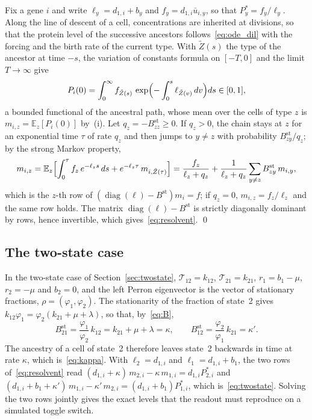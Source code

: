 \documentclass[a4paper, 11pt]{article}
\DeclareMathOperator{\diag}{diag}
\newcommand{\E}{\mathbb{E}}
\newcommand{\Tg}{\mathcal{T}}
\theoremstyle{plain}
\theoremstyle{remark}
\begin{document}
Fix a gene $i$ and write $\ell_y = d_{1,i} + b_y$ and $f_y = d_{1,i}\bar u_{i,y}$, so that $P^\ast_y = f_y/\ell_y$. Along the line of descent of a cell, concentrations are inherited at divisions, so that the protein level of the successive ancestors follows~\eqref{eq:ode_dil} with the forcing and the birth rate of the current type. With $\tilde Z(s)$ the type of the ancestor at time $-s$, the variation of constants formula on $[-T, 0]$ and the limit $T \to \infty$ give
\[
P_i(0) = \int_0^\infty f_{\tilde Z(s)}\,\exp\Bigl(-\int_0^s \ell_{\tilde Z(v)}\,dv\Bigr)ds \in [0,1],
\]
a bounded functional of the ancestral path, whose mean over the cells of type $z$ is $m_{i,z} = \E_z[P_i(0)]$ by~(i). Let $q_z = -B^{\mathrm{st}}_{zz} \geq 0$. If $q_z > 0$, the chain stays at $z$ for an exponential time $\tau$ of rate $q_z$ and then jumps to $y \neq z$ with probability $B^{\mathrm{st}}_{zy}/q_z$; by the strong Markov property,
\[
m_{i,z} = \E_z\Bigl[\int_0^\tau f_z\,e^{-\ell_z s}\,ds + e^{-\ell_z\tau}\,m_{i,\tilde Z(\tau)}\Bigr]
= \frac{f_z}{\ell_z + q_z} + \frac{1}{\ell_z + q_z}\sum_{y\neq z}B^{\mathrm{st}}_{zy}\,m_{i,y},
\]
which is the $z$-th row of $(\diag(\ell) - B^{\mathrm{st}})m_i = f$; if $q_z = 0$, $m_{i,z} = f_z/\ell_z$ and the same row holds. The matrix $\diag(\ell) - B^{\mathrm{st}}$ is strictly diagonally dominant by rows, hence invertible, which gives~\eqref{eq:resolvent}. \qed

\subsection{The two-state case}\label{sup:twocomp}

In the two-state case of Section~\ref{sec:twostate}, $\Tg_{12} = k_{12}$, $\Tg_{21} = k_{21}$, $r_1 = b_1 - \mu$, $r_2 = -\mu$ and $b_2 = 0$, and the left Perron eigenvector is the vector of stationary fractions, $\rho = (\varphi_1, \varphi_2)$. The stationarity of the fraction of state~2 gives $k_{12}\varphi_1 = \varphi_2(k_{21} + \mu + \lambda)$, so that, by~\eqref{eq:B},
\[
B^{\mathrm{st}}_{21} = \frac{\varphi_1}{\varphi_2}\,k_{12} = k_{21} + \mu + \lambda = \kappa, \qquad B^{\mathrm{st}}_{12} = \frac{\varphi_2}{\varphi_1}\,k_{21} = \kappa' .
\]
The ancestry of a cell of state~2 therefore leaves state~2 backwards in time at rate $\kappa$, which is~\eqref{eq:kappa}. With $\ell_2 = d_{1,i}$ and $\ell_1 = d_{1,i} + b_1$, the two rows of~\eqref{eq:resolvent} read $(d_{1,i} + \kappa)\,m_{2,i} - \kappa\,m_{1,i} = d_{1,i}P^\ast_{2,i}$ and $(d_{1,i} + b_1 + \kappa')\,m_{1,i} - \kappa'\,m_{2,i} = (d_{1,i} + b_1)P^\ast_{1,i}$, which is~\eqref{eq:twostate}. Solving the two rows jointly gives the exact levels that the readout must reproduce on a simulated toggle switch.
\end{document}
